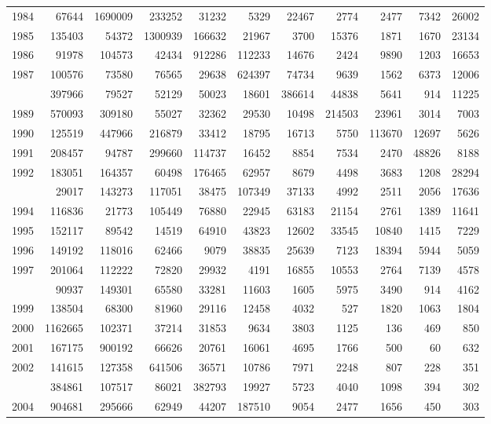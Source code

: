 \documentclass[
]{article}
\begin{document}
\begin{longtable}[t]{lrrrrrrrrrr}
1984 & 67644 & 1690009 & 233252 & 31232 & 5329 & 22467 & 2774 & 2477 & 7342 & 26002\\
1985 & 135403 & 54372 & 1300939 & 166632 & 21967 & 3700 & 15376 & 1871 & 1670 & 23134\\
1986 & 91978 & 104573 & 42434 & 912286 & 112233 & 14676 & 2424 & 9890 & 1203 & 16653\\
1987 & 100576 & 73580 & 76565 & 29638 & 624397 & 74734 & 9639 & 1562 & 6373 & 12006\\
\addlinespace
1988 & 397966 & 79527 & 52129 & 50023 & 18601 & 386614 & 44838 & 5641 & 914 & 11225\\
1989 & 570093 & 309180 & 55027 & 32362 & 29530 & 10498 & 214503 & 23961 & 3014 & 7003\\
1990 & 125519 & 447966 & 216879 & 33412 & 18795 & 16713 & 5750 & 113670 & 12697 & 5626\\
1991 & 208457 & 94787 & 299660 & 114737 & 16452 & 8854 & 7534 & 2470 & 48826 & 8188\\
1992 & 183051 & 164357 & 60498 & 176465 & 62957 & 8679 & 4498 & 3683 & 1208 & 28294\\
\addlinespace
1993 & 29017 & 143273 & 117051 & 38475 & 107349 & 37133 & 4992 & 2511 & 2056 & 17636\\
1994 & 116836 & 21773 & 105449 & 76880 & 22945 & 63183 & 21154 & 2761 & 1389 & 11641\\
1995 & 152117 & 89542 & 14519 & 64910 & 43823 & 12602 & 33545 & 10840 & 1415 & 7229\\
1996 & 149192 & 118016 & 62466 & 9079 & 38835 & 25639 & 7123 & 18394 & 5944 & 5059\\
1997 & 201064 & 112222 & 72820 & 29932 & 4191 & 16855 & 10553 & 2764 & 7139 & 4578\\
\addlinespace
1998 & 90937 & 149301 & 65580 & 33281 & 11603 & 1605 & 5975 & 3490 & 914 & 4162\\
1999 & 138504 & 68300 & 81960 & 29116 & 12458 & 4032 & 527 & 1820 & 1063 & 1804\\
2000 & 1162665 & 102371 & 37214 & 31853 & 9634 & 3803 & 1125 & 136 & 469 & 850\\
2001 & 167175 & 900192 & 66626 & 20761 & 16061 & 4695 & 1766 & 500 & 60 & 632\\
2002 & 141615 & 127358 & 641506 & 36571 & 10786 & 7971 & 2248 & 807 & 228 & 351\\
\addlinespace
2003 & 384861 & 107517 & 86021 & 382793 & 19927 & 5723 & 4040 & 1098 & 394 & 302\\
2004 & 904681 & 295666 & 62949 & 44207 & 187510 & 9054 & 2477 & 1656 & 450 & 303\\

\end{longtable}
\end{document}

